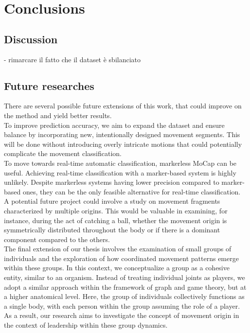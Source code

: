 \chapter{Conclusions}

\section{Discussion}
- rimarcare il fatto che il dataset è sbilanciato



\section{Future researches}
There are several possible future extensions of this work, that could improve on the method
and yield better results.\\

To improve prediction accuracy, we aim to expand the dataset and ensure balance by incorporating new, intentionally designed movement segments.
This will be done without introducing overly intricate motions that could potentially complicate the movement classification.
\\
To move towards real-time automatic classification, markerless MoCap can be useful.
Achieving real-time classification with a marker-based system is highly unlikely.
Despite markerless systems having lower precision compared to marker-based ones, they can be the only feasible alternative for real-time classification.
\\
A potential future project could involve a study on movement fragments characterized by multiple origins.
This would be valuable in examining, for instance, during the act of catching a ball, whether the movement origin is symmetrically distributed throughout the body or if there is a dominant component compared to the others.
\\
The final extension of our thesis involves the examination of small groups of individuals and the exploration of how coordinated movement patterns emerge within these groups.
In this context, we conceptualize a group as a cohesive entity, similar to an organism.
Instead of treating individual joints as players, we adopt a similar approach within the framework of graph and game theory, but at a higher anatomical level.
Here, the group of individuals collectively functions as a single body, with each person within the group assuming the role of a player.
As a result, our research aims to investigate the concept of movement origin in the context of leadership within these group dynamics.